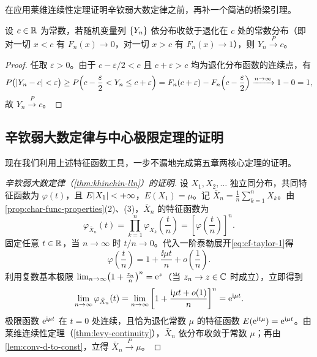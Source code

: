 在应用莱维连续性定理证明辛钦弱大数定律之前，再补一个简洁的桥梁引理。

\begin{lemma}[依分布收敛于常数等价于依概率收敛]
\label{lem:conv-d-to-const}
设 $c\in\mathbb{R}$ 为常数，若随机变量列 $\{Y_n\}$ 依分布收敛于退化在 $c$ 处的常数分布（即对一切 $x<c$ 有 $F_n(x)\to 0$，对一切 $x>c$ 有 $F_n(x)\to 1$），则 $Y_n\xrightarrow{P} c$。
\end{lemma}
\begin{proof}
任取 $\varepsilon>0$。由于 $c-\varepsilon/2<c$ 且 $c+\varepsilon>c$ 均为退化分布函数的连续点，有
\[
  P\bigl(\lvert Y_n-c\rvert<\varepsilon\bigr)
  \ge P\!\left(c-\frac{\varepsilon}{2}<Y_n\le c+\varepsilon\right)
  =F_n(c+\varepsilon)-F_n\!\left(c-\frac{\varepsilon}{2}\right)
  \xrightarrow{n\to\infty} 1-0=1,
\]
故 $Y_n\xrightarrow{P} c$。
\end{proof}

\subsection{辛钦弱大数定律与中心极限定理的证明}

现在我们利用上述特征函数工具，一步不漏地完成第五章两核心定理的证明。

\begin{proof}[辛钦弱大数定律（\cref{thm:khinchin-lln}）的证明]
设 $X_1,X_2,\ldots$ 独立同分布，共同特征函数为 $\varphi(t)$，且 $E\lvert X_1\rvert<+\infty$，$E(X_1)=\mu$。记 $\bar{X}_n=\frac{1}{n}\sum_{k=1}^{n}X_k$。由\cref{prop:char-func-properties}(2)、(3)，$\bar{X}_n$ 的特征函数为
\[
  \varphi_{\bar{X}_n}(t)=\prod_{k=1}^{n}\varphi_{X_k}\!\left(\frac{t}{n}\right)
  =\left[\varphi\!\left(\frac{t}{n}\right)\right]^n.
\]
固定任意 $t\in\mathbb{R}$，当 $n\to\infty$ 时 $t/n\to 0$。代入一阶泰勒展开\eqref{eq:cf-taylor-1}得
\[
  \varphi\!\left(\frac{t}{n}\right)=1+\frac{\ii\mu t}{n}+o\!\left(\frac{1}{n}\right).
\]
利用复数基本极限 $\lim_{n\to\infty}\bigl(1+\frac{z_n}{n}\bigr)^n=\mathrm{e}^z$（当 $z_n\to z\in\mathbb{C}$ 时成立），立即得到
\[
  \lim_{n\to\infty}\varphi_{\bar{X}_n}(t)
  =\lim_{n\to\infty}\left[1+\frac{\mathrm{i}\mu t+o(1)}{n}\right]^n
  =\mathrm{e}^{\mathrm{i}\mu t}.
\]
极限函数 $\mathrm{e}^{\mathrm{i}\mu t}$ 在 $t=0$ 处连续，且恰为退化常数 $\mu$ 的特征函数 $E(\mathrm{e}^{\mathrm{i} t\mu})=\mathrm{e}^{\mathrm{i}\mu t}$。由莱维连续性定理（\cref{thm:levy-continuity}），$\bar{X}_n$ 依分布收敛于常数 $\mu$；再由\cref{lem:conv-d-to-const}，立得 $\bar{X}_n\xrightarrow{P}\mu$。
\end{proof}

